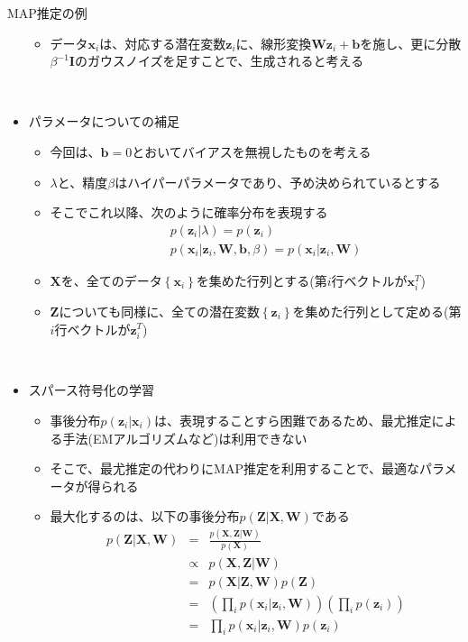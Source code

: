 \documentclass[dvipdfmx,notheorems,t]{beamer}
\begin{document}
\begin{frame}{MAP推定の例}
\begin{itemize}
\begin{itemize}
		\item データ$\bm{x}_i$は、対応する潜在変数$\bm{z}_i$に、線形変換$\bm{W} \bm{z}_i + \bm{b}$を施し、更に分散$\beta^{-1} \bm{I}$のガウスノイズを足すことで、生成されると考える
	\end{itemize} \
	
	\item パラメータについての補足
	\begin{itemize}
		\item 今回は、$\bm{b} = 0$とおいて\alert{バイアスを無視}したものを考える
		\item $\lambda$と、精度$\beta$は\alert{ハイパーパラメータ}であり、予め決められているとする
		\item そこでこれ以降、次のように確率分布を表現する
		\begin{eqnarray}
			&& p(\bm{z}_i | \lambda) = p(\bm{z}_i) \\
			&& p(\bm{x}_i | \bm{z}_i, \bm{W}, \bm{b}, \beta) = p(\bm{x}_i | \bm{z}_i, \bm{W})
		\end{eqnarray}
		
		\item $\bm{X}$を、全てのデータ$\left\{ \bm{x}_i \right\}$を集めた行列とする(第$i$行ベクトルが$\bm{x}_i^T$)
		\item $\bm{Z}$についても同様に、全ての潜在変数$\left\{ \bm{z}_i \right\}$を集めた行列として定める(第$i$行ベクトルが$\bm{z}_i^T$)
	\end{itemize} \
	
	\item スパース符号化の学習
	\begin{itemize}
		\item 事後分布$p(\bm{z}_i | \bm{x}_i)$は、\alert{表現することすら困難}であるため、最尤推定による手法(EMアルゴリズムなど)は利用できない
		\item そこで、最尤推定の代わりに\alert{MAP推定}を利用することで、最適なパラメータが得られる
		\newline
		\item 最大化するのは、以下の事後分布$p(\bm{Z} | \bm{X}, \bm{W})$である
		\begin{eqnarray}
			p(\bm{Z} | \bm{X}, \bm{W}) &=& \frac{p(\bm{X}, \bm{Z} | \bm{W})}{p(\bm{X})} \\
			&\propto& p(\bm{X}, \bm{Z} | \bm{W}) \\
			&=& p(\bm{X} | \bm{Z}, \bm{W}) p(\bm{Z}) \\
			&=& \left( \prod_i p(\bm{x}_i | \bm{z}_i, \bm{W}) \right) \left( \prod_i p(\bm{z}_i) \right) \\
			&=& \prod_i p(\bm{x}_i | \bm{z}_i, \bm{W}) p(\bm{z}_i)
		\end{eqnarray}
		

\end{itemize}
\end{itemize}
\end{frame}
\end{document}
